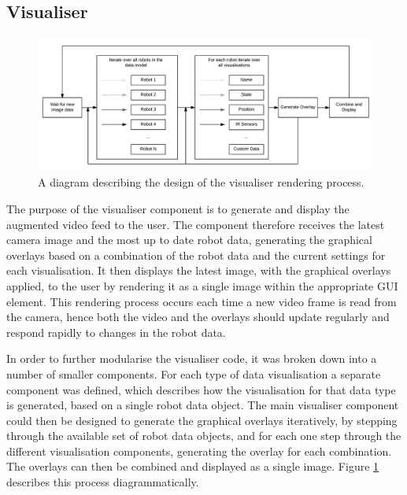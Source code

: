 \subsection{Visualiser} \label{VisualiserDesign}
\begin{figure}[h]
	\centering
	\includegraphics[scale=0.7]{Figures/VisualiserProcess.png}
	\decoRule
	\caption[Visualiser Render Process Design]{A diagram describing the design of the visualiser rendering process.}
	\label{fig:VisualiserProcess}
\end{figure}

The purpose of the visualiser component is to generate and display the augmented video feed to the user. The component therefore receives the latest camera image and the most up to date robot data, generating the graphical overlays based on a combination of the robot data and the current settings for each visualisation. It then displays the latest image, with the graphical overlays applied, to the user by rendering it as a single image within the appropriate GUI element. This rendering process occurs each time a new video frame is read from the camera, hence both the video and the overlays should update regularly and respond rapidly to changes in the robot data.

In order to further modularise the visualiser code, it was broken down into a number of smaller components. For each type of data visualisation a separate component was defined, which describes how the visualisation for that data type is generated, based on a single robot data object. The main visualiser component could then be designed to generate the graphical overlays iteratively, by stepping through the available set of robot data objects, and for each one step through the different visualisation components, generating the overlay for each combination. The overlays can then be combined and displayed as a single image. Figure \ref{fig:VisualiserProcess} describes this process diagrammatically.


